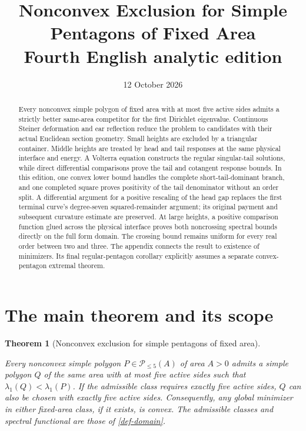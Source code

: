 \documentclass[11pt,a4paper]{article}
\title{\textbf{Nonconvex Exclusion for Simple Pentagons of Fixed Area}\\[6pt]\large Fourth English analytic edition}
\author{}
\date{12 October 2026}
\theoremstyle{proofmanuscript}
\newtheorem{theorem}{Theorem}[section]
\begin{document}
\maketitle
\begin{abstract}
Every nonconvex simple polygon of fixed area with at most five active sides admits a strictly better same-area competitor for the first Dirichlet eigenvalue. Continuous Steiner deformation and ear reflection reduce the problem to candidates with their actual Euclidean section geometry. Small heights are excluded by a triangular container. Middle heights are treated by head and tail responses at the same physical interface and energy. A Volterra equation constructs the regular singular-tail solutions, while direct differential comparisons prove the tail and cotangent response bounds. In this edition, one convex lower bound handles the complete short-tail-dominant branch, and one completed square proves positivity of the tail denominator without an order split. A differential argument for a positive rescaling of the head gap replaces the first terminal curve's degree-seven squared-remainder argument; its original payment and subsequent curvature estimate are preserved. At large heights, a positive comparison function glued across the physical interface proves both noncrossing spectral bounds directly on the full form domain. The crossing bound remains uniform for every real order between two and three. The appendix connects the result to existence of minimizers. Its final regular-pentagon corollary explicitly assumes a separate convex-pentagon extremal theorem.
\end{abstract}
\clearpage
\tableofcontents
\clearpage


\section{The main theorem and its scope}

\begin{theorem}[Nonconvex exclusion for simple pentagons of fixed area]\label{thm-main-nonconvex-pentagon}

Every nonconvex simple polygon \(P\in\mathscr P_{\le5}(A)\) of area \(A>0\) admits a simple polygon \(Q\) of the same area with at most five active sides such that \(\lambda_1(Q)<\lambda_1(P)\). If the admissible class requires exactly five active sides, \(Q\) can also be chosen with exactly five active sides. Consequently, any global minimizer in either fixed-area class, if it exists, is convex. The admissible classes and spectral functional are those of \ref{def-domain}.

\end{theorem}
\end{document}
